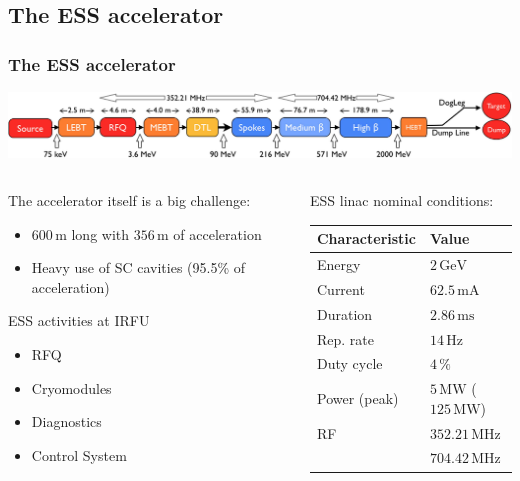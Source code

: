 \subsection{The ESS accelerator}
\begin{frame}[t]
  \frametitle{The ESS accelerator}
  \includegraphics[width=\textwidth]{01_Neutron/fig/fig000_ESS_acc}
  \vfill
  \begin{columns}
    \begin{column}{0.45\textwidth}
      The accelerator itself is a big challenge:
      \begin{itemize}
        \item $600\,\mathrm{m}$ long with $356\,\mathrm{m}$ of acceleration
        \item Heavy use of SC cavities (95.5\% of acceleration)
      \end{itemize}
      \begin{block}{ESS activities at IRFU}
        \begin{itemize}
          \item RFQ
          \item Cryomodules
          \item Diagnostics
          \item Control System
        \end{itemize}
      \end{block}
    \end{column}
    \begin{column}{0.50\textwidth}
      ESS linac nominal conditions:
      
      \begin{tabularx}{\linewidth}{XX}
        \toprule
        Characteristic & Value                                 \\
        \midrule
        Energy         & $2\,\mathrm{GeV}$                     \\
        Current        & $62.5\,\mathrm{mA}$                   \\
        Duration       & $2.86\,\mathrm{ms}$                   \\
        Rep. rate      & $14\,\mathrm{Hz}$                     \\
        Duty cycle     & $4\,\mathrm{\%}$                      \\
        Power (peak)   & $5\,\mathrm{MW}$ ($125\,\mathrm{MW}$) \\
        RF             & $352.21\,\mathrm{MHz}$                \\
                       & $704.42\,\mathrm{MHz}$                \\
        \bottomrule
      \end{tabularx}
    \end{column}
  \end{columns}
\end{frame}